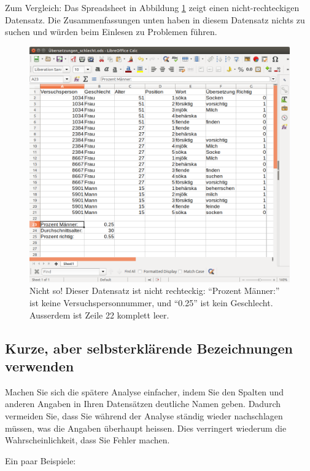 \documentclass[oneside, 10pt]{book}\usepackage[]{graphicx}\usepackage[]{xcolor}
\begin{document}
Zum Vergleich: Das Spread\-sheet in Abbildung \ref{fig:berechnungen_im_Spreadsheet} zeigt einen
nicht-rechteckigen Datensatz. Die Zusammenfassungen unten
haben in diesem Datensatz nichts zu suchen und würden
beim Einlesen zu Problemen führen.

\begin{figure}[tp]
\includegraphics[width = \textwidth]{figs/datensatz_schlecht.png}
\caption{Nicht so! Dieser Datensatz ist nicht rechteckig: ``Prozent Männer:'' ist keine Versuchspersonnummer, und ``0.25'' ist kein Geschlecht. Ausserdem ist Zeile 22 komplett leer.}
\label{fig:berechnungen_im_Spreadsheet}
\end{figure}

\subsection{Kurze, aber selbsterklärende Bezeichnungen verwenden}
Machen Sie sich die spätere Analyse einfacher, indem Sie den
Spalten und anderen Angaben in Ihren Datensätzen deutliche Namen geben.
Dadurch vermeiden Sie, dass Sie während der Analyse
ständig wieder nachschlagen müssen, was die
Angaben überhaupt heissen. Dies verringert wiederum
die Wahrscheinlichkeit, dass Sie Fehler machen.

Ein paar Beispiele:
\end{document}
